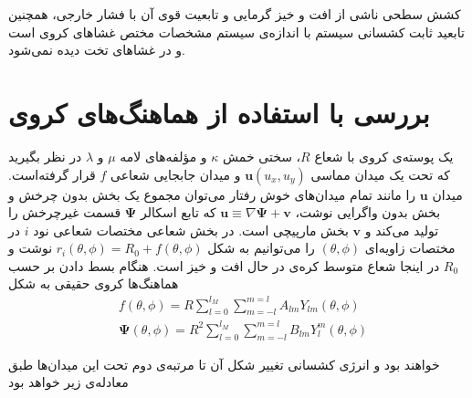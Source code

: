 کشش سطحی ناشی از افت و خیز گرمایی و تابعیت قوی آن با فشار خارجی، همچنین تابعید ثابت کشسانی سیستم با اندازه‌ی سیستم مشخصات مختص غشاهای کروی است و در غشا‌های تخت دیده نمی‌شود. 
\section{بررسی با استفاده از هماهنگ‌های کروی}
یک پوسته‌ی کروی با شعاع $R$، سختی خمش $\kappa$ و مؤلفه‌های لامه $\mu$ و $\lambda$ 
در نظر بگیرید که تحت یک میدان مماسی $\boldsymbol u(u_x,u_y)$
و میدان جابجایی شعاعی $f$
قرار گرفته‌است. میدان $\boldsymbol u$
را مانند تمام میدان‌های خوش رفتار می‌توان مجموع یک بخش بدون چرخش
و بخش بدون واگرایی
نوشت، $\boldsymbol u\equiv\nabla\boldsymbol\Psi+\boldsymbol v$ که تابع اسکالر $\boldsymbol\Psi$ قسمت غیرچرخش
 را تولید می‌کند و $\boldsymbol v$ بخش مارپیچی
 است. در بخش شعاعی مختصات شعاعی نود $i$ 
 در مختصات زاویه‌ای $(\theta,\phi)$ را می‌توانیم به شکل $r_i(\theta,\phi)=R_0+f(\theta,\phi)$
 نوشت و $R_0$ در اینجا شعاع متوسط کره‌ی در حال افت و خیز است.
 هنگام بسط دادن بر حسب هماهنگ‌ها کروی حقیقی به شکل
\begin{equation}
\begin{aligned}
&f(\theta,\phi)=R\sum_{l=0}^{l_M}\sum_{m=-l}^{m=l}A_{lm}Y_{lm}(\theta,\phi)\\
&\boldsymbol\Psi(\theta,\phi)=R^2\sum_{l=0}^{l_M}\sum_{m=-l}^{m=l}B_{lm}Y_l^m(\theta,\phi)
\label{eq:nelsonS28.1}
\end{aligned}
\end{equation} 

خواهند بود و انرژی کشسانی تغییر شکل آن تا مرتبه‌ی دوم تحت این میدان‌ها طبق معادله‌ی زیر خواهد بود \cite{krollPRE1993}

